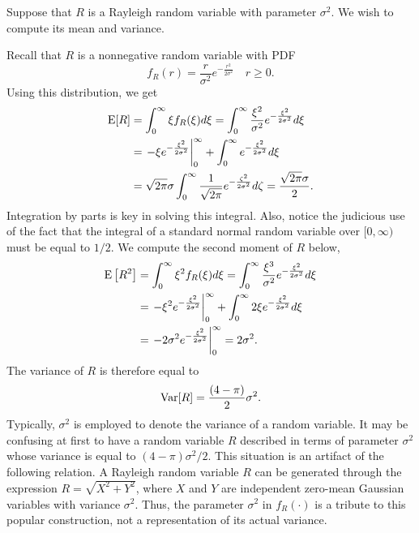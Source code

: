 \begin{example}
Suppose that $R$ is a Rayleigh random variable with parameter $\sigma^2$.
We wish to compute its mean and variance.

Recall that $R$ is a nonnegative random variable with PDF
\begin{equation*}
f_R (r) = \frac{r}{\sigma^2} e^{- \frac{r^2}{2 \sigma^2} } \quad r \geq 0 .
\end{equation*}
Using this distribution, we get
\begin{equation*}
\begin{split}
\mathrm{E} [R] &= \int_0^{\infty} \xi f_R(\xi) d\xi
= \int_0^{\infty} \frac{\xi^2}{\sigma^2} e^{- \frac{\xi^2}{2 \sigma^2}} d\xi \\
&= \left. - \xi e^{- \frac{\xi^2}{2 \sigma^2}} \right|_0^{\infty}
+ \int_0^{\infty} e^{- \frac{\xi^2}{2 \sigma^2}} d\xi \\
&= \sqrt{ 2 \pi } \sigma \int_0^{\infty} \frac{1}{\sqrt{2 \pi}} e^{- \frac{\zeta^2}{2 \sigma^2}} d\zeta
= \frac{\sqrt{2 \pi} \sigma}{2} .
\end{split}
\end{equation*}
Integration by parts is key in solving this integral.
Also, notice the judicious use of the fact that the integral of a standard normal random variable over $[0, \infty)$ must be equal to $1/2$.
We compute the second moment of $R$ below,
\begin{equation*}
\begin{split}
\mathrm{E} \left[ R^2 \right] &= \int_0^{\infty} \xi^2 f_R(\xi) d\xi
= \int_0^{\infty} \frac{\xi^3}{\sigma^2} e^{- \frac{\xi^2}{2 \sigma^2}} d\xi \\
&= \left. - \xi^2 e^{- \frac{\xi^2}{2 \sigma^2}} \right|_0^{\infty}
+ \int_0^{\infty} 2 \xi e^{- \frac{\xi^2}{2 \sigma^2}} d\xi \\
&= \left. - 2 \sigma^2 e^{- \frac{\xi^2}{2 \sigma^2}} \right|_0^{\infty}
= 2 \sigma^2 .
\end{split}
\end{equation*}
The variance of $R$ is therefore equal to
\begin{equation*}
\mathrm{Var} [R] = \frac{(4 - \pi)}{2} \sigma^2 .
\end{equation*}
Typically, $\sigma^2$ is employed to denote the variance of a random variable.
It may be confusing at first to have a random variable $R$ described in terms of parameter $\sigma^2$ whose variance is equal to $(4 - \pi) \sigma^2/2$.
This situation is an artifact of the following relation.
A Rayleigh random variable $R$ can be generated through the expression $R = \sqrt{X^2 + Y^2}$, where $X$ and $Y$ are independent zero-mean Gaussian variables with variance $\sigma^2$.
Thus, the parameter $\sigma^2$ in $f_R (\cdot)$ is a tribute to this popular construction, not a representation of its actual variance.
\end{example}

